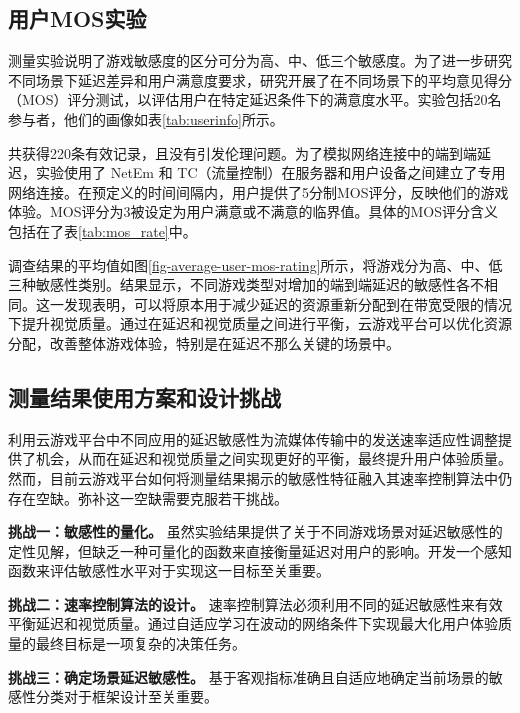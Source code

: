 \subsection{用户MOS实验}\label{sec-mos}

测量实验说明了游戏敏感度的区分可分为高、中、低三个敏感度。为了进一步研究不同场景下延迟差异和用户满意度要求，研究开展了在不同场景下的平均意见得分（MOS）评分测试，以评估用户在特定延迟条件下的满意度水平。实验包括20名参与者，他们的画像如表\ref{tab:userinfo}所示。



共获得220条有效记录，且没有引发伦理问题。为了模拟网络连接中的端到端延迟，实验使用了 NetEm 和 TC（流量控制）在服务器和用户设备之间建立了专用网络连接。在预定义的时间间隔内，用户提供了5分制MOS评分，反映他们的游戏体验。MOS评分为3被设定为用户满意或不满意的临界值。具体的MOS评分含义包括在了表\ref{tab:mos_rate}中。



调查结果的平均值如图\ref{fig-average-user-mos-rating}所示，将游戏分为高、中、低三种敏感性类别。结果显示，不同游戏类型对增加的端到端延迟的敏感性各不相同。这一发现表明，可以将原本用于减少延迟的资源重新分配到在带宽受限的情况下提升视觉质量。通过在延迟和视觉质量之间进行平衡，云游戏平台可以优化资源分配，改善整体游戏体验，特别是在延迟不那么关键的场景中。



\subsection{测量结果使用方案和设计挑战}
利用云游戏平台中不同应用的延迟敏感性为流媒体传输中的发送速率适应性调整提供了机会，从而在延迟和视觉质量之间实现更好的平衡，最终提升用户体验质量。然而，目前云游戏平台如何将测量结果揭示的敏感性特征融入其速率控制算法中仍存在空缺。弥补这一空缺需要克服若干挑战。

\textbf{挑战一：敏感性的量化。} 虽然实验结果提供了关于不同游戏场景对延迟敏感性的定性见解，但缺乏一种可量化的函数来直接衡量延迟对用户的影响。开发一个感知函数来评估敏感性水平对于实现这一目标至关重要。

\textbf{挑战二：速率控制算法的设计。} 速率控制算法必须利用不同的延迟敏感性来有效平衡延迟和视觉质量。通过自适应学习在波动的网络条件下实现最大化用户体验质量的最终目标是一项复杂的决策任务。

\textbf{挑战三：确定场景延迟敏感性。} 基于客观指标准确且自适应地确定当前场景的敏感性分类对于框架设计至关重要。

